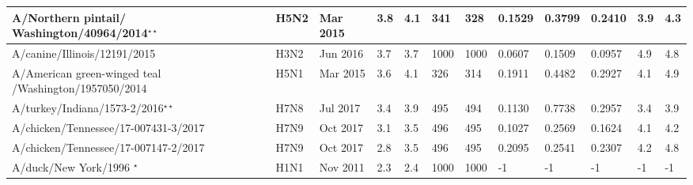 \begin{tabular}{L{1.32in}|L{.35in}|L{.3in}|L{.3in}|L{.3in}|L{.35in}|L{.35in}|L{.35in}|L{.35in}|L{.32in}|L{.3in}|L{.3in}}
 A/Northern  pintail/ Washington/40964/2014$^{\star\star}$ &H5N2& Mar  2015 &3.8&4.1&341&328&0.1529&0.3799&0.2410&3.9&4.3\\\hline
 A/canine/Illinois/12191/2015 &H3N2& Jun  2016 &3.7&3.7&1000&1000&0.0607&0.1509&0.0957&4.9&4.8\\\hline
 A/American  green-winged  teal /Washington/1957050/2014 &H5N1& Mar 2015 &3.6&4.1&326&314&0.1911&0.4482&0.2927&4.1&4.9\\\hline
 A/turkey/Indiana/1573-2/2016$^{\star\star}$ &H7N8& Jul  2017 &3.4&3.9&495&494&0.1130&0.7738&0.2957&3.4&3.9\\\hline
 A/chicken/Tennessee/17-007431-3/2017 &H7N9& Oct  2017 &3.1&3.5&496&495&0.1027&0.2569&0.1624&4.1&4.2\\\hline
 A/chicken/Tennessee/17-007147-2/2017 &H7N9& Oct  2017 &2.8&3.5&496&495&0.2095&0.2541&0.2307&4.2&4.8\\\hline
 A/duck/New  York/1996 $^\star$&H1N1& Nov  2011 &2.3&2.4&1000&1000&-1&-1&-1&-1&-1\\\hline
 \end{tabular}